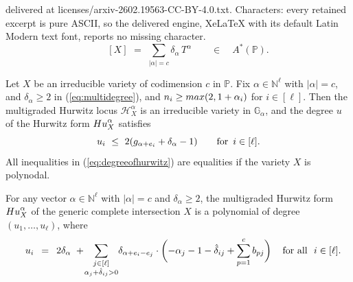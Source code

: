\documentclass[10pt,a4paper]{amsart}
\newcommand{\bG}{\mathbb G}
\newcommand{\bN}{\mathbb N}
\newcommand{\bP}{\mathbb P}
\newcommand{\cH}{\mathcal H}
\begin{document}
delivered at licenses/arxiv-2602.19563-CC-BY-4.0.txt. Characters: every retained excerpt is pure ASCII, so the delivered engine, XeLaTeX with its default Latin Modern text font, reports no missing character.
\begin{equation}
\label{eq:multidegree}
\qquad    [X] \,\, = \,\, \sum_{|\alpha|=c} \delta_\alpha\,T^{\alpha} \qquad \in \quad A^*(\bP).
\end{equation}

\begin{theorem} \label{thm:degree}
	Let $X$ be an irreducible variety of codimension $c$ in $\bP$. 
	Fix $\alpha  \in \bN^\ell$ with $|\alpha| = c$, and
		$\delta_\alpha \geq 2$ in (\ref{eq:multidegree}),
		and $n_i \geq {\rm max}(2,1+\alpha_i)$
	 	  for $i\in[\ell]$.
Then  the multigraded Hurwitz locus  $\cH^\alpha_X$ is an irreducible variety in $\bG_\alpha$, and
the degree $u$ of the     Hurwitz form ${\rm Hu}^\alpha_X$ satisfies
\begin{equation}
\label{eq:degreeofhurwitz}
        u_i \,\,\le\,\, 2 (g_{\alpha+e_i}+\delta_\alpha - 1) \qquad \hbox{for}  \,\,\, i \in [\ell].
\end{equation}
All inequalities in (\ref{eq:degreeofhurwitz}) are equalities if the variety $X$ is polynodal.
\end{theorem}

\begin{theorem} \label{thm:CIformula}
For any vector $\alpha \in \bN^\ell$ with $|\alpha| = c$ and $\delta_\alpha \geq 2$,
the multigraded Hurwitz form ${\rm Hu}^\alpha_X$ of the generic complete intersection $X$
is a polynomial of degree $(u_1,\ldots,u_\ell)$, where
\begin{equation}
\label{eq:CIui}
     \quad u_i \,\,\,= \,\,\,2 \delta_\alpha  \, \, +\!
     \sum_{\substack{j\in[\ell]\\\alpha_j+\hat{\delta}_{ij}>0}} 
     \! \delta_{\alpha+e_i-e_j} \cdot \biggl(-\alpha_j-1-\hat{\delta}_{ij}+\sum_{p=1}^c b_{pj} \biggr)\,
\quad \hbox{for all}\,\,\, \,i \in [\ell] .
\end{equation}
\end{theorem}
\end{document}
